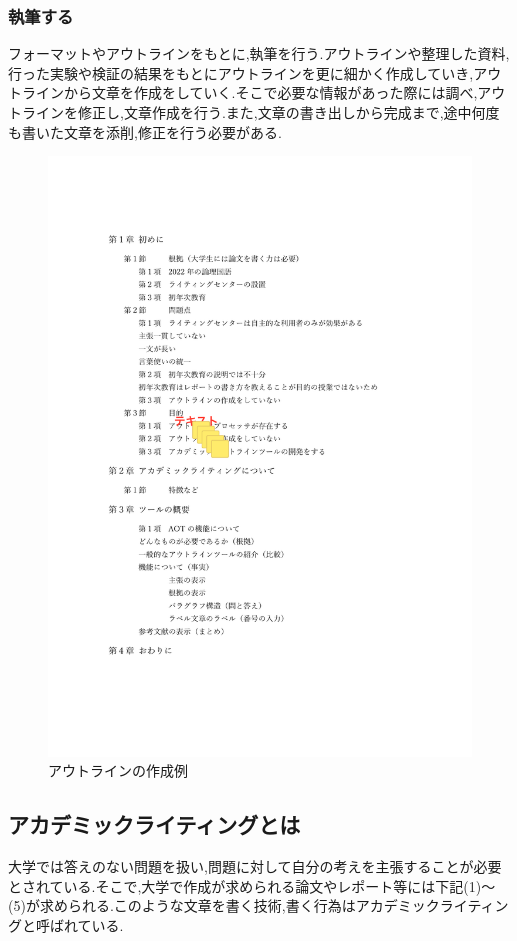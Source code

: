 \documentclass[a4j,12pt]{jarticle}
\begin{document}
\subsubsection{執筆する}
フォーマットやアウトラインをもとに,執筆を行う.アウトラインや整理した資料,行った実験や検証の結果をもとにアウトラインを更に細かく作成していき,アウトラインから文章を作成をしていく.そこで必要な情報があった際には調べ,アウトラインを修正し,文章作成を行う.また,文章の書き出しから完成まで,途中何度も書いた文章を添削,修正を行う必要がある.

\begin{figure}[h]
\begin{center}
 \includegraphics[scale=0.3]{outline.pdf}
\end{center}
 \caption{アウトラインの作成例}
 \label{fig:a}
\end{figure}
\newpage

\subsection{アカデミックライティングとは}
大学では答えのない問題を扱い,問題に対して自分の考えを主張することが必要とされている.そこで,大学で作成が求められる論文やレポート等には下記(1)〜(5)が求められる.このような文章を書く技術,書く行為はアカデミックライティングと呼ばれている\cite{ren2}.
\end{document}
